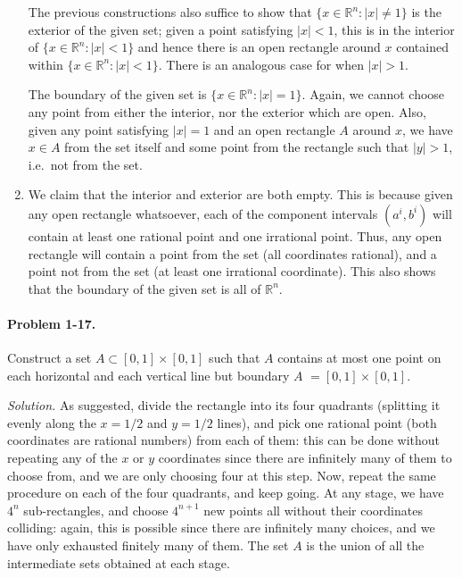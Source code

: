 \documentclass[11pt]{report}
\newcommand{\R}{\mathbb{R}}
\newcommand{\problem}[1]{\paragraph{Problem #1.}}
\newcommand{\solution}{\noindent\textit{Solution.} }
\begin{document}
\begin{enumerate}
        The previous constructions also suffice to show that $\{x \in \R^n : |x| \neq
        1\}$ is the exterior of the given set; given a point satisfying $|x| < 1$,
        this is in the interior of $\{x \in \R^n : |x| < 1\}$ and hence there is an
        open rectangle around $x$ contained within $\{x \in \R^n : |x| < 1\}$. There
        is an analogous case for when $|x| > 1$.

        The boundary of the given set is $\{x \in \R^n : |x| = 1\}$. Again, we cannot
        choose any point from either the interior, nor the exterior which are open.
        Also, given any point satisfying $|x| = 1$ and an open rectangle $A$ around
        $x$, we have $x \in A$ from the set itself and some point from the rectangle
        such that $|y| > 1$, i.e.\ not from the set.

        \item We claim that the interior and exterior are both empty. This is because
        given any open rectangle whatsoever, each of the component intervals $(a^i,
        b^i)$ will contain at least one rational point and one irrational point.
        Thus, any open rectangle will contain a point from the set (all coordinates
        rational), and a point not from the set (at least one irrational coordinate).
        This also shows that the boundary of the given set is all of $\R^n$.
    \end{enumerate}


    \problem{1-17} Construct a set $A \subset [0, 1] \times [0, 1]$ such that $A$
    contains at most one point on each horizontal and each vertical line but boundary
    $A$ $= [0, 1] \times [0, 1]$.

    \solution As suggested, divide the rectangle into its four quadrants (splitting
    it evenly along the $x = 1 / 2$ and $y = 1 / 2$ lines), and pick one rational
    point (both coordinates are rational numbers) from each of them: this can be done
    without repeating any of the $x$ or $y$ coordinates since there are infinitely
    many of them to choose from, and we are only choosing four at this step. Now,
    repeat the same procedure on each of the four quadrants, and keep going. At any
    stage, we have $4^n$ sub-rectangles, and choose $4^{n + 1}$ new points all
    without their coordinates colliding: again, this is possible since there are
    infinitely many choices, and we have only exhausted finitely many of them. The
    set $A$ is the union of all the intermediate sets obtained at each stage.
\end{document}
